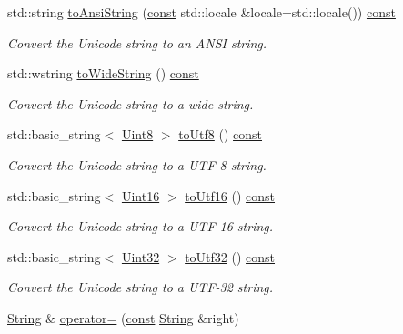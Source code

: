 \begin{DoxyCompactItemize}
std\-::string \hyperlink{classsf_1_1_string_a71d111ccfaf295b8b8be8ca4a3ceb5f4}{to\-Ansi\-String} (\hyperlink{term__entry_8h_a57bd63ce7f9a353488880e3de6692d5a}{const} std\-::locale \&locale=std\-::locale()) \hyperlink{term__entry_8h_a57bd63ce7f9a353488880e3de6692d5a}{const} 
\begin{DoxyCompactList}\small\item\em Convert the Unicode string to an A\-N\-S\-I string. \end{DoxyCompactList}\item 
std\-::wstring \hyperlink{classsf_1_1_string_afd8b085ad7255543e4dc1285389d2d82}{to\-Wide\-String} () \hyperlink{term__entry_8h_a57bd63ce7f9a353488880e3de6692d5a}{const} 
\begin{DoxyCompactList}\small\item\em Convert the Unicode string to a wide string. \end{DoxyCompactList}\item 
std\-::basic\-\_\-string$<$ \hyperlink{namespacesf_a4ef3d630785c4f296f9b4f274c33d78e}{Uint8} $>$ \hyperlink{classsf_1_1_string_a6669450d88e8284fd90d1ba457c30fa0}{to\-Utf8} () \hyperlink{term__entry_8h_a57bd63ce7f9a353488880e3de6692d5a}{const} 
\begin{DoxyCompactList}\small\item\em Convert the Unicode string to a U\-T\-F-\/8 string. \end{DoxyCompactList}\item 
std\-::basic\-\_\-string$<$ \hyperlink{namespacesf_a2fcaf787248b0b83dfb6b145ca348246}{Uint16} $>$ \hyperlink{classsf_1_1_string_abaa37ec39d40f44a2bff4ad3059bef47}{to\-Utf16} () \hyperlink{term__entry_8h_a57bd63ce7f9a353488880e3de6692d5a}{const} 
\begin{DoxyCompactList}\small\item\em Convert the Unicode string to a U\-T\-F-\/16 string. \end{DoxyCompactList}\item 
std\-::basic\-\_\-string$<$ \hyperlink{namespacesf_aa746fb1ddef4410bddf198ebb27e727c}{Uint32} $>$ \hyperlink{classsf_1_1_string_a70f6bdf579125e1cb52329e34a981168}{to\-Utf32} () \hyperlink{term__entry_8h_a57bd63ce7f9a353488880e3de6692d5a}{const} 
\begin{DoxyCompactList}\small\item\em Convert the Unicode string to a U\-T\-F-\/32 string. \end{DoxyCompactList}\item 
\hyperlink{classsf_1_1_string}{String} \& \hyperlink{classsf_1_1_string_a096255c066e5ef8c31952216b8ce9c42}{operator=} (\hyperlink{term__entry_8h_a57bd63ce7f9a353488880e3de6692d5a}{const} \hyperlink{classsf_1_1_string}{String} \&right)

\end{DoxyCompactItemize}
